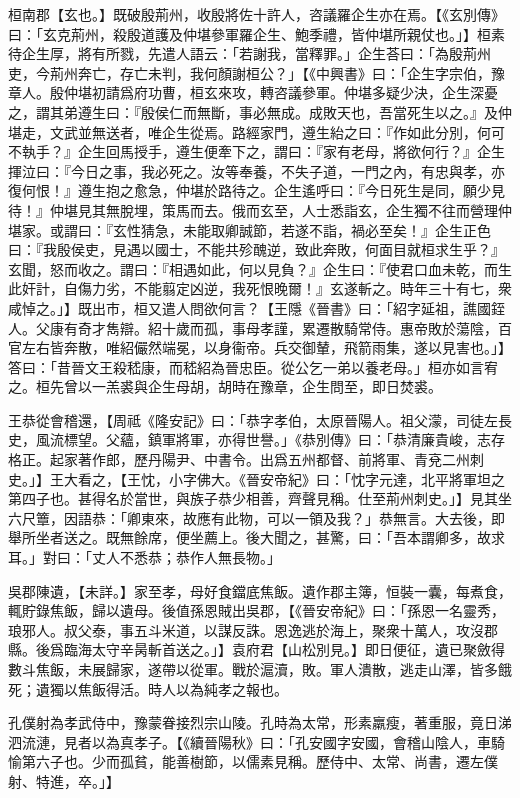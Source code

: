 桓南郡【玄也。】既破殷荊州，收殷將佐十許人，咨議羅企生亦在焉。【《玄別傳》曰：「玄克荊州，殺殷道護及仲堪參軍羅企生、鮑季禮，皆仲堪所親仗也。」】桓素待企生厚，將有所戮，先遣人語云：「若謝我，當釋罪。」企生荅曰：「為殷荊州吏，今荊州奔亡，存亡未判，我何顏謝桓公？」【《中興書》曰：「企生字宗伯，豫章人。殷仲堪初請爲府功曹，桓玄來攻，轉咨議參軍。仲堪多疑少決，企生深憂之，謂其弟遵生曰：『殷侯仁而無斷，事必無成。成敗天也，吾當死生以之。』及仲堪走，文武並無送者，唯企生從焉。路經家門，遵生紿之曰：『作如此分別，何可不執手？』企生回馬授手，遵生便牽下之，謂曰：『家有老母，將欲何行？』企生揮泣曰：『今日之事，我必死之。汝等奉養，不失子道，⼀門之內，有忠與孝，亦復何恨！』遵生抱之愈急，仲堪於路待之。企生遙呼曰：『今日死生是同，願少見待！』仲堪見其無脫埋，策⾺而去。俄而玄至，人士悉詣玄，企生獨不往而營理仲堪家。或謂曰：『玄性猜急，未能取卿誠節，若遂不詣，禍必至矣！』企生正色曰：『我殷侯吏，見遇以國士，不能共殄醜逆，致此奔敗，何面目就桓求生乎？』玄聞，怒而收之。謂曰：『相遇如此，何以見負？』企生曰：『使君口血未乾，而生此奸計，自傷力劣，不能翦定凶逆，我死恨晚爾！』玄遂斬之。時年三十有七，衆咸悼之。」】既出市，桓又遣人問欲何言？【王隱《晉書》曰：「紹字延祖，譙國銍人。父康有奇才雋辯。紹十歲而孤，事母孝謹，累遷散騎常侍。惠帝敗於蕩陰，百官左右皆奔散，唯紹儼然端冕，以身衞帝。兵交御輦，飛箭雨集，遂以見害也。」】答曰：「昔晉文王殺嵇康，而嵇紹為晉忠臣。從公乞一弟以養老母。」桓亦如言宥之。桓先曾以一羔裘與企生母胡，胡時在豫章，企生問至，即日焚裘。

王恭從會稽還，【周祗《隆安記》曰：「恭字孝伯，太原晉陽人。祖父濛，司徒左長史，風流標望。父蘊，鎮軍將軍，亦得世譽。」《恭別傳》曰：「恭清廉貴峻，志存格正。起家著作郎，歷丹陽尹、中書令。出爲五州都督、前將軍、青兗⼆州刺史。」】王大看之，【王忱，小字佛大。《晉安帝紀》曰：「忱字元達，北平將軍坦之第四子也。甚得名於當世，與族子恭少相善，齊聲見稱。仕至荊州刺史。」】見其坐六尺簟，因語恭：「卿東來，故應有此物，可以一領及我？」恭無言。大去後，即舉所坐者送之。既無餘席，便坐薦上。後大聞之，甚驚，曰：「吾本謂卿多，故求耳。」對曰：「丈人不悉恭；恭作人無長物。」

吳郡陳遺，【未詳。】家至孝，母好食鐺底焦飯。遺作郡主簿，恒裝一囊，每煮食，輒貯錄焦飯，歸以遺母。後值孫恩賊出吳郡，【《晉安帝紀》曰：「孫恩⼀名靈秀，琅邪人。叔父泰，事五斗米道，以謀反誅。恩逸逃於海上，聚衆十萬人，攻沒郡縣。後爲臨海太守辛昺斬首送之。」】袁府君【山松別見。】即日便征，遺已聚斂得數斗焦飯，未展歸家，遂帶以從軍。戰於滬瀆，敗。軍人潰散，逃走山澤，皆多餓死；遺獨以焦飯得活。時人以為純孝之報也。

孔僕射為孝武侍中，豫蒙眷接烈宗山陵。孔時為太常，形素羸瘦，著重服，竟日涕泗流漣，見者以為真孝子。【《續晉陽秋》曰：「孔安國字安國，會稽山陰人，⾞騎愉第六子也。少⽽孤貧，能善樹節，以儒素見稱。歷侍中、太常、尚書，遷左僕射、特進，卒。」】

